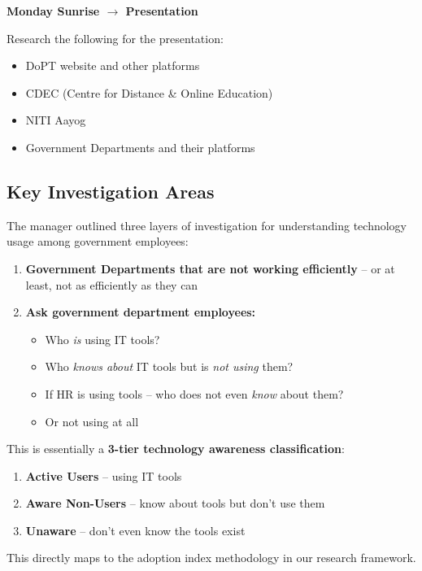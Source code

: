 \documentclass[12pt,a4paper]{article}
\begin{document}
\begin{actionbox}
\textbf{Monday Sunrise $\rightarrow$ Presentation}

\noindent Research the following for the presentation:
\begin{itemize}
  \item DoPT website and other platforms
  \item CDEC (Centre for Distance \& Online Education)
  \item NITI Aayog
  \item Government Departments and their platforms
\end{itemize}
\end{actionbox}

\subsection{Key Investigation Areas}

The manager outlined three layers of investigation for understanding technology usage among government employees:

\begin{enumerate}[label=\textbf{Layer \arabic*:}]
  \item \textbf{Government Departments that are not working efficiently} -- or at least, not as efficiently as they can
  \item \textbf{Ask government department employees:}
    \begin{itemize}
      \item[$\rightarrow$] Who \textit{is} using IT tools?
      \item[$\rightarrow$] Who \textit{knows about} IT tools but is \textit{not using} them?
      \item[$\rightarrow$] If HR is using tools -- who does not even \textit{know} about them?
      \item[$\rightarrow$] Or not using at all
    \end{itemize}
\end{enumerate}

\begin{insightbox}
This is essentially a \textbf{3-tier technology awareness classification}:
\begin{enumerate}
  \item \textbf{Active Users} -- using IT tools
  \item \textbf{Aware Non-Users} -- know about tools but don't use them
  \item \textbf{Unaware} -- don't even know the tools exist
\end{enumerate}
This directly maps to the adoption index methodology in our research framework.
\end{insightbox}
\end{document}
